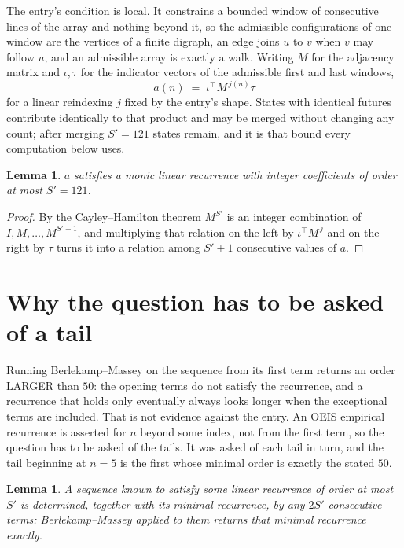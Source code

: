 \documentclass[11pt,a4paper]{article}
\theoremstyle{plain}
\newtheorem{lemma}[theorem]{Lemma}
\theoremstyle{definition}
\begin{document}
The entry's condition is local. It constrains a bounded window of consecutive lines of the
array and nothing beyond it, so the admissible configurations of one window are the vertices of
a finite digraph, an edge joins $u$ to $v$ when $v$ may follow $u$, and an admissible array is
exactly a walk. Writing $M$ for the adjacency matrix and $\iota,\tau$ for the indicator vectors
of the admissible first and last windows,
\[
a(n)\;=\;\iota^{\!\top}M^{\,j(n)}\tau
\]
for a linear reindexing $j$ fixed by the entry's shape. States with identical futures
contribute identically to that product and may be merged without changing any count; after
merging $S'=121$ states remain, and it is that bound every computation below uses.

\begin{lemma}\label{lem:cf}
$a$ satisfies a monic linear recurrence with integer coefficients of order at most $S'=121$.
\end{lemma}

\begin{proof}
By the Cayley--Hamilton theorem $M^{S'}$ is an integer combination of $I,M,\dots,M^{S'-1}$,
and multiplying that relation on the left by $\iota^{\!\top}M^{\,j}$ and on the right by
$\tau$ turns it into a relation among $S'+1$ consecutive values of $a$.
\end{proof}

\section{Why the question has to be asked of a tail}

Running Berlekamp--Massey on the sequence from its first term returns an order LARGER than $50$: the opening terms do not satisfy the recurrence, and a recurrence that holds only eventually always looks longer when the exceptional terms are included. That is not evidence against the entry. An OEIS empirical recurrence is asserted for $n$ beyond some index, not from the first term, so the question has to be asked of the tails. It was asked of each tail in turn, and the tail beginning at $n=5$ is the first whose minimal order is exactly the stated $50$.

\begin{lemma}\label{lem:bm}
A sequence known to satisfy some linear recurrence of order at most $S'$ is determined,
together with its minimal recurrence, by any $2S'$ consecutive terms: Berlekamp--Massey applied
to them returns that minimal recurrence exactly.
\end{lemma}
\end{document}
